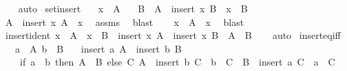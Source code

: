 \begin{isabellebody}
%
\isadelimproof
\ \ %
\endisadelimproof
%
\isatagproof
{}\isamarkupfalse%
\ auto%
\endisatagproof
{\isafoldproof}%
%
\isadelimproof
\isanewline
%
\endisadelimproof
\isanewline
{}\isamarkupfalse%
\ set{\isacharunderscore}{\kern0pt}insert{\isacharcolon}{\kern0pt}\isanewline
\ \ \ {\isachardoublequoteopen}x\ {\isasymin}\ A{\isachardoublequoteclose}\isanewline
\ \ \ B\ \ {\isachardoublequoteopen}A\ {\isacharequal}{\kern0pt}\ insert\ x\ B{\isachardoublequoteclose}\ \ {\isachardoublequoteopen}x\ {\isasymnotin}\ B{\isachardoublequoteclose}\isanewline
%
\isadelimproof
%
\endisadelimproof
%
\isatagproof
{}\isamarkupfalse%
\isanewline
\ \ \isamarkupfalse%
\ {\isachardoublequoteopen}A\ {\isacharequal}{\kern0pt}\ insert\ x\ {\isacharparenleft}{\kern0pt}A\ {\isacharminus}{\kern0pt}\ {\isacharbraceleft}{\kern0pt}x{\isacharbraceright}{\kern0pt}{\isacharparenright}{\kern0pt}{\isachardoublequoteclose}\ \isamarkupfalse%
\ assms\ \isamarkupfalse%
\ blast\isanewline
\ \ \isamarkupfalse%
\ {\isachardoublequoteopen}x\ {\isasymnotin}\ A\ {\isacharminus}{\kern0pt}\ {\isacharbraceleft}{\kern0pt}x{\isacharbraceright}{\kern0pt}{\isachardoublequoteclose}\ \isamarkupfalse%
\ blast\isanewline
{}\isamarkupfalse%
%
\endisatagproof
{\isafoldproof}%
%
\isadelimproof
\isanewline
%
\endisadelimproof
\isanewline
{}\isamarkupfalse%
\ insert{\isacharunderscore}{\kern0pt}ident{\isacharcolon}{\kern0pt}\ {\isachardoublequoteopen}x\ {\isasymnotin}\ A\ {\isasymLongrightarrow}\ x\ {\isasymnotin}\ B\ {\isasymLongrightarrow}\ insert\ x\ A\ {\isacharequal}{\kern0pt}\ insert\ x\ B\ {\isasymlongleftrightarrow}\ A\ {\isacharequal}{\kern0pt}\ B{\isachardoublequoteclose}\isanewline
%
\isadelimproof
\ \ %
\endisadelimproof
%
\isatagproof
{}\isamarkupfalse%
\ auto%
\endisatagproof
{\isafoldproof}%
%
\isadelimproof
\isanewline
%
\endisadelimproof
\isanewline
{}\isamarkupfalse%
\ insert{\isacharunderscore}{\kern0pt}eq{\isacharunderscore}{\kern0pt}iff{\isacharcolon}{\kern0pt}\isanewline
\ \ \ {\isachardoublequoteopen}a\ {\isasymnotin}\ A{\isachardoublequoteclose}\ {\isachardoublequoteopen}b\ {\isasymnotin}\ B{\isachardoublequoteclose}\isanewline
\ \ \ {\isachardoublequoteopen}insert\ a\ A\ {\isacharequal}{\kern0pt}\ insert\ b\ B\ {\isasymlongleftrightarrow}\isanewline
\ \ \ \ {\isacharparenleft}{\kern0pt}if\ a\ {\isacharequal}{\kern0pt}\ b\ then\ A\ {\isacharequal}{\kern0pt}\ B\ else\ {\isasymexists}C{\isachardot}{\kern0pt}\ A\ {\isacharequal}{\kern0pt}\ insert\ b\ C\ {\isasymand}\ b\ {\isasymnotin}\ C\ {\isasymand}\ B\ {\isacharequal}{\kern0pt}\ insert\ a\ C\ {\isasymand}\ a\ {\isasymnotin}\ C{\isacharparenright}{\kern0pt}{\isachardoublequoteclose}\isanewline

\end{isabellebody}
